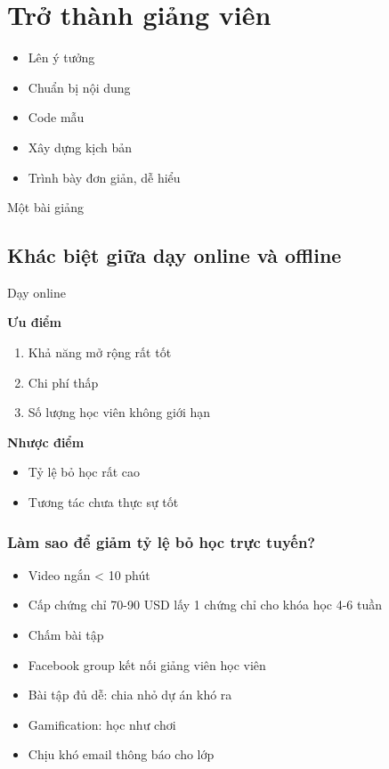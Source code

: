 \chapter{Trở thành giảng viên}


\begin{itemize}
  \item Lên ý tưởng
  \item Chuẩn bị nội dung
  \item Code mẫu
  \item Xây dựng kịch bản
  \item Trình bày đơn giản, dễ hiểu
\end{itemize}


Một bài giảng

\section{Khác biệt giữa dạy online và offline}

Dạy online

\textbf{Ưu điểm}

\begin{enumerate}
  \item Khả năng mở rộng rất tốt
  \item Chi phí thấp
  \item Số lượng học viên không giới hạn
\end{enumerate}

\textbf{Nhược điểm}

\begin{itemize}
  \item Tỷ lệ bỏ học rất cao
  \item Tương tác chưa thực sự tốt
\end{itemize}

\subsection{Làm sao để giảm tỷ lệ bỏ học trực tuyến?}

\begin{itemize}
  \item Video ngắn < 10 phút
  \item Cấp chứng chỉ 70-90 USD lấy 1 chứng chỉ cho khóa học 4-6 tuần
  \item Chấm bài tập
  \item Facebook group kết nối giảng viên học viên
  \item Bài tập đủ dễ: chia nhỏ dự án khó ra
  \item Gamification: học như chơi
  \item Chịu khó email thông báo cho lớp
\end{itemize}

